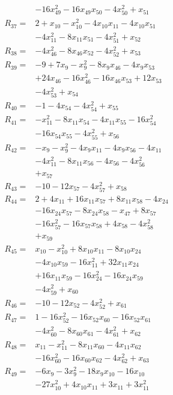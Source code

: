 \begin{align*}
&-16x_{49}^{2} -16x_{49}x_{50} -4x_{50}^{2} +x_{51}\\[3pt]
R_{37}={}&2 +x_{10} -x_{10}^{2} -4x_{10}x_{11} -4x_{10}x_{51}\\
&-4x_{11}^{2} -8x_{11}x_{51} -4x_{51}^{2} +x_{52}\\[3pt]
R_{38}={}&-4x_{46}^{2} -8x_{46}x_{52} -4x_{52}^{2} +x_{53}\\[3pt]
R_{39}={}&-9 +7x_{9} -x_{9}^{2} -8x_{9}x_{46} -4x_{9}x_{53}\\
&+24x_{46} -16x_{46}^{2} -16x_{46}x_{53} +12x_{53}\\
&-4x_{53}^{2} +x_{54}\\[3pt]
R_{40}={}&-1 -4x_{54} -4x_{54}^{2} +x_{55}\\[3pt]
R_{41}={}&-x_{11}^{2} -8x_{11}x_{54} -4x_{11}x_{55} -16x_{54}^{2}\\
&-16x_{54}x_{55} -4x_{55}^{2} +x_{56}\\[3pt]
R_{42}={}&-x_{9} -x_{9}^{2} -4x_{9}x_{11} -4x_{9}x_{56} -4x_{11}\\
&-4x_{11}^{2} -8x_{11}x_{56} -4x_{56} -4x_{56}^{2}\\
&+x_{57}\\[3pt]
R_{43}={}&-10 -12x_{57} -4x_{57}^{2} +x_{58}\\[3pt]
R_{44}={}&2 +4x_{11} +16x_{11}x_{57} +8x_{11}x_{58} -4x_{24}\\
&-16x_{24}x_{57} -8x_{24}x_{58} -x_{47} +8x_{57}\\
&-16x_{57}^{2} -16x_{57}x_{58} +4x_{58} -4x_{58}^{2}\\
&+x_{59}\\[3pt]
R_{45}={}&x_{10} -x_{10}^{2} +8x_{10}x_{11} -8x_{10}x_{24}\\
&-4x_{10}x_{59} -16x_{11}^{2} +32x_{11}x_{24}\\
&+16x_{11}x_{59} -16x_{24}^{2} -16x_{24}x_{59}\\
&-4x_{59}^{2} +x_{60}\\[3pt]
R_{46}={}&-10 -12x_{52} -4x_{52}^{2} +x_{61}\\[3pt]
R_{47}={}&1 -16x_{52}^{2} -16x_{52}x_{60} -16x_{52}x_{61}\\
&-4x_{60}^{2} -8x_{60}x_{61} -4x_{61}^{2} +x_{62}\\[3pt]
R_{48}={}&x_{11} -x_{11}^{2} -8x_{11}x_{60} -4x_{11}x_{62}\\
&-16x_{60}^{2} -16x_{60}x_{62} -4x_{62}^{2} +x_{63}\\[3pt]
R_{49}={}&-6x_{9} -3x_{9}^{2} -18x_{9}x_{10} -16x_{10}\\
&-27x_{10}^{2} +4x_{10}x_{11} +3x_{11} +3x_{11}^{2}\\

\end{align*}
